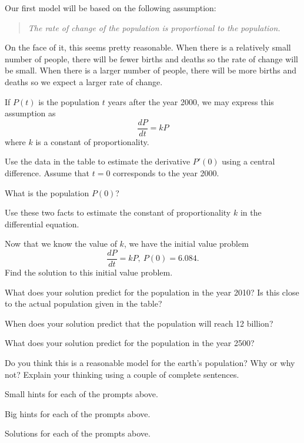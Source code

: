 \begin{activity} \label{A:7.6.1}  
  Our first model will be based on the following assumption:
  \begin{quote}{\em
      The rate of change of the population is proportional to the
      population.  
    }
  \end{quote}

  On the face of it, this seems pretty reasonable.  When there is a
  relatively small number of people, there will be fewer births and
  deaths so the rate of change will be small.  When there is a larger
  number of people, there will be more births and deaths so we expect
  a larger rate of change.

  If $P(t)$ is the population $t$ years after the year 2000, we may
  express this assumption as
  $$
  \frac{dP}{dt} = kP
  $$
  where $k$ is a constant of proportionality.

\ba
\item Use the data in the table to estimate the derivative $P'(0)$
  using a central difference.  Assume that $t=0$ corresponds to the
  year 2000.

\item What is the population $P(0)$?

\item Use these two facts to estimate the constant of proportionality
  $k$ in the differential equation.

\item Now that we know the value of $k$, we have the initial
  value problem
  $$
    \frac{dP}{dt} = kP, \ P(0) = 6.084.
  $$
  Find the solution to this initial value problem.

\item What does your solution predict for the population in the year
  2010?  Is this close to the actual population given in the table?

\item When does your solution predict that the population will reach
  12 billion?

\item What does your solution predict for the population in the year
  2500? 

\item Do you think this is a reasonable model for the earth's
  population?  Why or why not?  Explain your thinking using a couple
  of complete sentences. 

\ea
\end{activity}
\begin{smallhint}
\ba
	\item Small hints for each of the prompts above.
\ea
\end{smallhint}
\begin{bighint}
\ba
	\item Big hints for each of the prompts above.
\ea
\end{bighint}
\begin{activitySolution}
\ba
	\item Solutions for each of the prompts above.
\ea
\end{activitySolution}
\aftera
